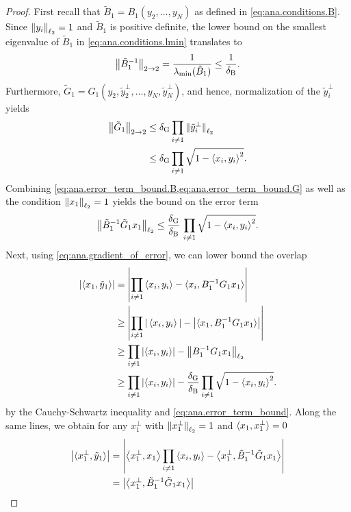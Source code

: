 \begin{proof}
  First recall that $\tilde B_1 = B_1(y_2, \ldots, y_N)$ as defined in \cref{eq:ana.conditions.B}.
  Since ${\Vert y_i\Vert}_{\ell_2} = 1$ and $\tilde B_1$ is positive definite, the lower bound on the smallest eigenvalue of $\tilde B_1$ in \cref{eq:ana.conditions.lmin} translates to
  \[
    \label{eq:ana.error_term_bound.B}
    {\left\Vert\tilde B_1^{-1}\right\Vert}_{2 \to 2} = \frac{1}{\lambda_\mathrm{min}(\tilde B_1)} \le \frac{1}{\delta_\mathrm{B}}.
  \]
  Furthermore, $\tilde G_1 = G_1(y_2, \tilde y_2^\perp, \ldots, y_N, \tilde y_N^\perp)$, and hence, normalization of the $\tilde y_i^\perp$ yields
  \[
    \label{eq:ana.error_term_bound.G}
    \begin{split}
      {\left\Vert\tilde G_1\right\Vert}_{2 \to 2}
      &\le \delta_\mathrm{G} \prod_{i \neq 1} {\Vert\tilde y_i^\perp\Vert}_{\ell_2} \\
      &\le \delta_\mathrm{G} \prod_{i \neq 1} \sqrt{1 - {\braket{x_i, y_i}}^2}.
    \end{split}
  \]
  Combining \cref{eq:ana.error_term_bound.B,eq:ana.error_term_bound.G} as well as the condition ${\Vert x_1\Vert}_{\ell_2} = 1$ yields the bound on the error term
  \[
    \label{eq:ana.error_term_bound}
    {\left\Vert\tilde B_1^{-1} \tilde G_1 x_1\right\Vert}_{\ell_2}
    \leq \frac{\delta_\mathrm{G}}{\delta_\mathrm{B}} \, \prod_{i \neq 1} \sqrt{1 - {\braket{x_i, y_i}}^2}.
  \]
  Next, using \cref{eq:ana.gradient_of_error}, we can lower bound the overlap
  \begin{align}
    {\left\vert\braket{x_1, \tilde y_1}\right\vert}
    &= {\left\vert\prod_{i \neq 1} \braket{x_i, y_i} - \braket{x_i, B_1^{-1} G_1 x_1}\right\vert} \\
    &\ge {\left\vert\prod_{i \neq 1} {\vert\braket{x_i, y_i}\vert} - {\left\vert\braket{x_1, B_1^{-1} G_1 x_1}\right\vert}\right\vert} \\
    &\ge {\prod_{i \neq 1} {\left\vert\braket{x_i, y_i}\right\vert} - {\left\Vert B_1^{-1} G_1 x_1\right\Vert}_{\ell_2}} \\
    &\ge {\prod_{i \neq 1} {\left\vert\braket{x_i, y_i}\right\vert} - \frac{\delta_\mathrm{G}}{\delta_\mathrm{B}} \prod_{i \neq 1} \sqrt{1 - {\braket{x_i, y_i}}^2}}.
    \label{eq:ana.local_error_bound_step.overlap_x}
  \end{align}
  by the Cauchy-Schwartz inequality and \cref{eq:ana.error_term_bound}.
  Along the same lines, we obtain for any $x_1^\perp$ with ${\Vert x_1^\perp\Vert}_{\ell_2} = 1$ and $\braket{x_1, x_1^\perp} = 0$
  \begin{align}
    \Abs{\braket{x_1^\perp, \tilde y_1}}
    &= \Abs{\Braket{x_1^\perp, x_1} \prod_{i \neq 1} \Braket{x_i, y_i} - \Braket{x_1^\perp, \tilde B_1^{-1} \tilde G_1 x_1}} \\
    &= \Abs{\Braket{x_1^\perp, \tilde B_1^{-1} \tilde G_1 x_1}} \\

\end{align}
\end{proof}
